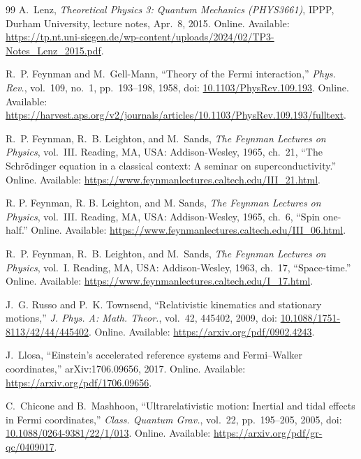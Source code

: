 \documentclass[11pt]{article}
\numberwithin{equation}{section}
\begin{document}
\begin{thebibliography}{99}
A.~Lenz, \emph{Theoretical Physics 3: Quantum Mechanics (PHYS3661)},
IPPP, Durham University, lecture notes, Apr.~8, 2015.
Online. Available:
\url{https://tp.nt.uni-siegen.de/wp-content/uploads/2024/02/TP3-Notes_Lenz_2015.pdf}.

R.~P. Feynman and M.~Gell-Mann, ``Theory of the Fermi interaction,''
\emph{Phys. Rev.}, vol.~109, no.~1, pp.~193--198, 1958,
doi: \href{https://doi.org/10.1103/PhysRev.109.193}{10.1103/PhysRev.109.193}.
Online. Available:
\url{https://harvest.aps.org/v2/journals/articles/10.1103/PhysRev.109.193/fulltext}.

R.~P. Feynman, R.~B. Leighton, and M.~Sands,
\emph{The Feynman Lectures on Physics}, vol.~III.
Reading, MA, USA: Addison-Wesley, 1965, ch.~21,
``The Schr\"odinger equation in a classical context: A seminar on superconductivity.''
Online. Available: \url{https://www.feynmanlectures.caltech.edu/III_21.html}.

R. P. Feynman, R. B. Leighton, and M. Sands,
\emph{The Feynman Lectures on Physics}, vol.~III.
Reading, MA, USA: Addison-Wesley, 1965, ch.~6, ``Spin one-half.''
Online. Available: \url{https://www.feynmanlectures.caltech.edu/III_06.html}.

R.~P. Feynman, R.~B. Leighton, and M.~Sands,
\emph{The Feynman Lectures on Physics}, vol.~I.
Reading, MA, USA: Addison-Wesley, 1963, ch.~17, ``Space-time.''
Online. Available: \url{https://www.feynmanlectures.caltech.edu/I_17.html}.

J.~G. Russo and P.~K. Townsend,
``Relativistic kinematics and stationary motions,''
\emph{J. Phys. A: Math. Theor.}, vol.~42, 445402, 2009,
doi: \href{https://doi.org/10.1088/1751-8113/42/44/445402}{10.1088/1751-8113/42/44/445402}.
Online. Available: \url{https://arxiv.org/pdf/0902.4243}.

J.~Llosa, ``Einstein's accelerated reference systems and Fermi--Walker
coordinates,'' arXiv:1706.09656, 2017.
Online. Available: \url{https://arxiv.org/pdf/1706.09656}.

C.~Chicone and B.~Mashhoon, ``Ultrarelativistic motion: Inertial and
tidal effects in Fermi coordinates,'' \emph{Class. Quantum Grav.},
vol.~22, pp.~195--205, 2005,
doi: \href{https://doi.org/10.1088/0264-9381/22/1/013}{10.1088/0264-9381/22/1/013}.
Online. Available: \url{https://arxiv.org/pdf/gr-qc/0409017}.


\end{thebibliography}
\end{document}
